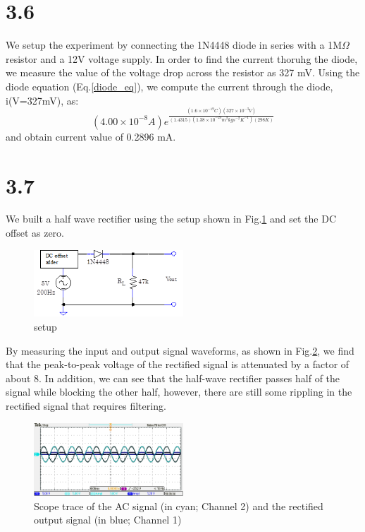 \documentclass[authoryear, 12pt,5p, times]{elsarticle}
\begin{document}
\section*{3.6}
We setup the experiment by connecting the 1N4448 diode in series with a 1M$\Omega$ resistor and a 12V voltage supply. In order to find the current thoruhg the diode, we measure the value of the voltage drop across the resistor as 327 mV. Using the diode equation (Eq.\ref{diode_eq}), we compute the current through the diode, i(V=327mV), as: 
\begin{equation*}
(4.00\times10^{-8}A)e^{\frac{(1.6\times10^{-19}C)(327\times10^{-3}V)}{(1.4315)(1.38\times10^{-23}m^2kgs^{-2}K^{-1})(298K)}}
\end{equation*}
and obtain current value of 0.2896 mA.
\section*{3.7}\label{3_7_q}
We built a half wave rectifier using the setup shown in Fig.\ref{3_7_setup} and set the DC offset as zero. 
\begin{figure}[h!]
\center
\includegraphics[width=0.5\textwidth]{figure/3_7_setup}
\caption{ setup}
\label{3_7_setup}
\end{figure}
By measuring the input and output signal waveforms, as shown in Fig.\ref{3_7_trace}, we find that the peak-to-peak voltage of the rectified signal is attenuated by a factor of about 8. In addition, we can see that the half-wave rectifier passes half of the signal while blocking the other half, however, there are still some rippling in the rectified signal that requires filtering.
\begin{figure}[h!]
\center
\includegraphics[width=0.5\textwidth]{figure/3_7}
\caption{Scope trace of the AC signal (in cyan; Channel 2) and the rectified output signal (in blue; Channel 1)}
\label{3_7_trace}
\end{figure}
\end{document}
